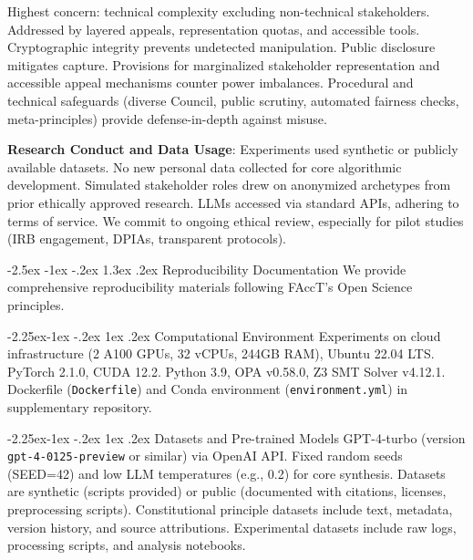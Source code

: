 \documentclass[manuscript,screen,9pt]{acmart}
\makeatletter
\renewcommand\section{\@startsection{section}{1}{\z@}%
  {-2.5ex \@plus -1ex \@minus -.2ex}%
  {1.3ex \@plus.2ex}%
  {\normalfont\Large\bfseries}}
\renewcommand\subsection{\@startsection{subsection}{2}{\z@}%
  {-2.25ex\@plus -1ex \@minus -.2ex}%
  {1ex \@plus .2ex}%
  {\normalfont\large\bfseries}}
\makeatother
\begin{document}
Highest concern: technical complexity excluding non-technical stakeholders. Addressed by layered appeals, representation quotas, and accessible tools. Cryptographic integrity prevents undetected manipulation. Public disclosure mitigates capture. Provisions for marginalized stakeholder representation and accessible appeal mechanisms counter power imbalances. Procedural and technical safeguards (diverse Council, public scrutiny, automated fairness checks, meta-principles) provide defense-in-depth against misuse.

\textbf{Research Conduct and Data Usage}:
Experiments used synthetic or publicly available datasets. No new personal data collected for core algorithmic development. Simulated stakeholder roles drew on anonymized archetypes from prior ethically approved research. LLMs accessed via standard APIs, adhering to terms of service. We commit to ongoing ethical review, especially for pilot studies (IRB engagement, DPIAs, transparent protocols).

\section{Reproducibility Documentation}
\label{app:reproducibility}
We provide comprehensive reproducibility materials following FAccT's Open Science principles.

\subsection{Computational Environment}
Experiments on cloud infrastructure (2 A100 GPUs, 32 vCPUs, 244GB RAM), Ubuntu 22.04 LTS. PyTorch 2.1.0, CUDA 12.2. Python 3.9, OPA v0.58.0, Z3 SMT Solver v4.12.1. Dockerfile (\texttt{Dockerfile}) and Conda environment (\texttt{environment.yml}) in supplementary repository.

\subsection{Datasets and Pre-trained Models}
GPT-4-turbo (version \texttt{gpt-4-0125-preview} or similar) via OpenAI API. Fixed random seeds (SEED=42) and low LLM temperatures (e.g., 0.2) for core synthesis. Datasets are synthetic (scripts provided) or public (documented with citations, licenses, preprocessing scripts). Constitutional principle datasets include text, metadata, version history, and source attributions. Experimental datasets include raw logs, processing scripts, and analysis notebooks.
\end{document}
